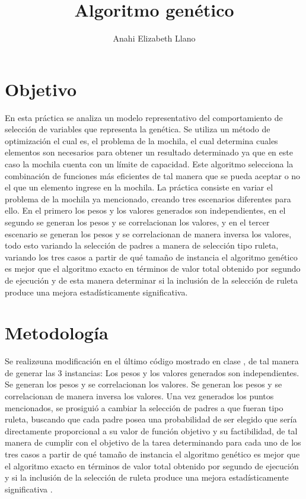 \documentclass{article}
\begin{document}
\title{\textbf{Algoritmo gen\'etico}}
\author{Anahi Elizabeth Llano}

\maketitle

\section{Objetivo}\label{obj}

En esta pr\'actica se analiza un modelo representativo del comportamiento de selecci\'on de variables que representa la gen\'etica. Se utiliza un m\'etodo de optimizaci\'on el cual es, el problema de la mochila, el cual determina cuales elementos son necesarios para obtener un resultado determinado ya que en este caso la mochila cuenta con un l\'imite de capacidad. Este algoritmo selecciona la combinaci\'on de funciones m\'as eficientes de tal manera que se pueda aceptar o no el que un elemento ingrese en la mochila.
La pr\'actica \cite{elisa} consiste en variar el problema de la mochila ya mencionado, creando tres escenarios diferentes para ello. En el primero los pesos y los valores generados son independientes, en el segundo se generan los pesos y se correlacionan los valores, y en el tercer escenario se generan los pesos y se correlacionan de manera inversa los valores, todo esto variando la selecci\'on de padres a manera de selecci\'on tipo ruleta, variando los tres casos a partir de qu\'e tama\~no de instancia el algoritmo gen\'etico es mejor que el algoritmo exacto en t\'erminos de valor total obtenido por segundo de ejecuci\'on y de esta manera determinar si la inclusi\'on de la selecci\'on de ruleta produce una mejora estad\'isticamente significativa.


\section{Metodolog\'{i}a}\label{met}

Se realiz\o una modificaci\'on en el \'ultimo c\'odigo mostrado en clase \citep{elisa}, de tal manera de generar las $3$ instancias:
Los pesos y los valores generados son independientes.
Se generan los pesos y se correlacionan los valores.
Se generan los pesos y se correlacionan de manera inversa los valores.
Una vez generados los puntos mencionados, se prosigui\'o a cambiar la selecci\'on de padres a que fueran tipo ruleta, buscando que cada padre posea una probabilidad de ser elegido que ser\'ia directamente proporcional a su valor de funci\'on objetivo y su factibilidad, de tal manera de cumplir con el objetivo de la tarea determinando para cada uno de los tres casos a partir de qu\'e tama\~no de instancia el algoritmo gen\'etico es mejor que el algoritmo exacto en t\'erminos de valor total obtenido por segundo de ejecuci\'on y si la inclusi\'on de la selecci\'on de ruleta produce una mejora estad\'isticamente significativa \citep{elisadisc}.
\end{document}
